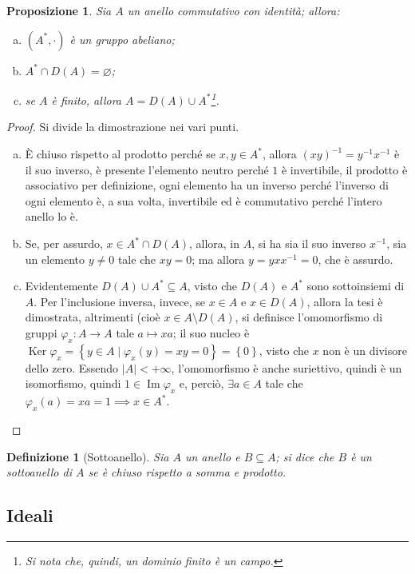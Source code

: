 \documentclass[12pt]{scrartcl}
\theoremstyle{style}
\newtheorem{definizione}{Definizione}[section]
\newtheorem{prop}{Proposizione}[section]
\numberwithin{equation}{subsection}
\begin{document}
\begin{prop}
	Sia $A $ un anello commutativo con identit\`a; allora:
	\begin{enumerate}[(a).]
		\item $(A^*,\cdot )$ \`e un gruppo abeliano;
		\item $A^* \cap D(A) = \varnothing$;
		\item se $A$ \`e finito, allora $A = D(A) \cup A^*$\footnote{Si nota che, quindi, un dominio finito \`e un campo.}.
	\end{enumerate}
\end{prop}
	\begin{proof}Si divide la dimostrazione nei vari punti.
		\begin{enumerate}[(a).]
			\item \`E chiuso rispetto al prodotto perch\'e se $x,y \in A^*$, allora $(xy)^{-1}=y^{-1}x^{-1}$ \`e il suo inverso, \`e presente l'elemento neutro perch\'e $1 $ \`e invertibile, il prodotto \`e associativo per definizione, ogni elemento ha un inverso perch\'e l'inverso di ogni elemento \`e, a sua volta, invertibile ed \`e commutativo perch\'e l'intero anello lo \`e.
			\item Se, per assurdo, $x \in A^* \cap D(A)$, allora, in $A$, si ha sia il suo inverso $x^{-1}$, sia un elemento $y\neq 0$ tale che $xy = 0$; ma allora $y = y x x^{-1} = 0$, che \`e assurdo.
			\item Evidentemente $D(A) \cup A^* \subseteq A$, visto che $D(A)$ e $A^*$ sono sottoinsiemi di $A$.
				Per l'inclusione inversa, invece, se $x \in A$ e $x \in D(A)$, allora la tesi \`e dimostrata, altrimenti (cio\`e $x \in A \setminus D(A)$, si definisce l'omomorfismo di gruppi $\varphi _x : A \to A$ tale $a\longmapsto xa$; il suo nucleo \`e $\operatorname{Ker} \varphi_x  = \left\{ y \in  A  \mid \varphi _x(y) = xy = 0 \right\} = \left\{ 0 \right\} $, visto che $x$ non \`e un divisore dello zero.
				Essendo $|A|<+\infty$, l'omomorfismo \`e anche suriettivo, quindi \`e un isomorfismo, quindi $1 \in \operatorname{Im} \varphi _x$ e, perci\`o, $\exists a \in A$ tale che $\varphi _x (a) = xa = 1\implies x \in A^*$.
		\end{enumerate}
	\end{proof}
\begin{definizione}
	[Sottoanello]
	Sia $A$ un anello e $B \subseteq A$; si dice che $B$ \`e un \textit{sottoanello} di $A$ se \`e chiuso rispetto a somma e prodotto.
\end{definizione}
\subsection{Ideali}
\end{document}
